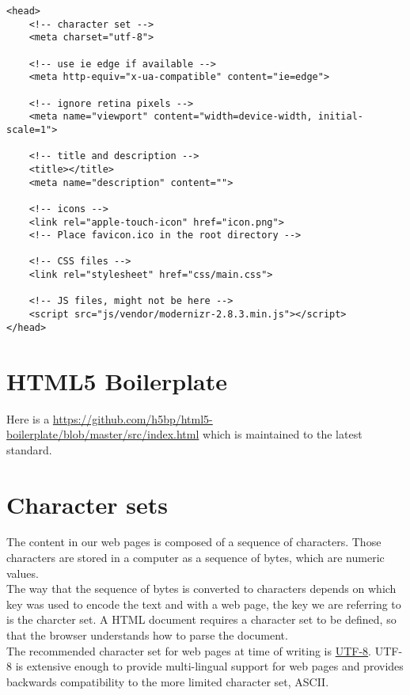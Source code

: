 \begin{verbatim}
<head>
    <!-- character set -->
    <meta charset="utf-8">

    <!-- use ie edge if available -->
    <meta http-equiv="x-ua-compatible" content="ie=edge">

    <!-- ignore retina pixels -->
    <meta name="viewport" content="width=device-width, initial-scale=1">

    <!-- title and description -->
    <title></title>
    <meta name="description" content="">

    <!-- icons -->
    <link rel="apple-touch-icon" href="icon.png">
    <!-- Place favicon.ico in the root directory -->

    <!-- CSS files -->
    <link rel="stylesheet" href="css/main.css">

    <!-- JS files, might not be here -->
    <script src="js/vendor/modernizr-2.8.3.min.js"></script>
</head>
\end{verbatim}

\section{HTML5 Boilerplate}

Here is a \href{link to the index.html for HTML5 Boilerplate}{https://github.com/h5bp/html5-boilerplate/blob/master/src/index.html} which is maintained to the latest standard.

\section{Character sets}

The content in our web pages is composed of a sequence of characters. Those characters are stored in a computer as a sequence of bytes, which are numeric values.
\\

The way that the sequence of bytes is converted to characters depends on which key was used to encode the text and with a web page, the key we are referring to is the charcter set. A HTML document requires a character set to be defined, so that the browser understands how to parse the document.
\\

The recommended character set for web pages at time of writing is \href{https://www.w3.org/International/questions/qa-choosing-encodings#useunicode}{UTF-8}. UTF-8 is extensive enough to provide multi-lingual support for web pages and provides backwards compatibility to the more limited character set, ASCII.
\\

